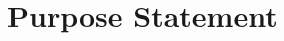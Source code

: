 \documentclass[
    a4paper,            %
    11pt,               %
    stu,                %
    donotrepeattitle,   %
    noextraspace,       %
    floatsintext,       %
    biblatex,           %
    colorlinks=true,        %
    linkcolor=red,          %
    anchorcolor=black,      %
    citecolor=blue,         %
    urlcolor=blue,          %
    bookmarks=true,         %
    bookmarksopen=false,    %
    bookmarksnumbered=true  %
]{apa7}
\begin{document}
\section{Purpose Statement}


\end{document}
